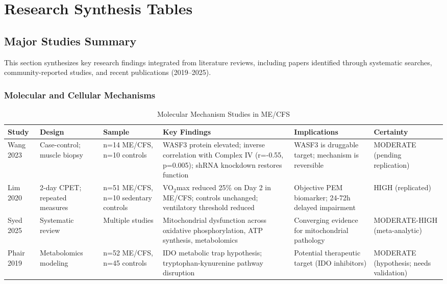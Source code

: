 \chapter{Research Synthesis Tables}
\label{app:research-synthesis}

\section{Major Studies Summary}
\label{sec:major-studies-summary}

This section synthesizes key research findings integrated from literature reviews, including papers identified through systematic searches, community-reported studies, and recent publications (2019--2025).

\subsection{Molecular and Cellular Mechanisms}
\label{subsec:molecular-mechanisms-studies}

\begin{table}[htbp]
\centering
\caption{Molecular Mechanism Studies in ME/CFS}
\label{tab:molecular-studies}
\scriptsize
\begin{tabular}{p{2cm}p{1.8cm}p{2.2cm}p{4cm}p{2.5cm}p{1.8cm}}
\toprule
\textbf{Study} & \textbf{Design} & \textbf{Sample} & \textbf{Key Findings} & \textbf{Implications} & \textbf{Certainty} \\
\midrule
Wang 2023~\cite{wang2023wasf3} & Case-control; muscle biopsy & n=14 ME/CFS, n=10 controls & WASF3 protein elevated; inverse correlation with Complex IV (r=-0.55, p=0.005); shRNA knockdown restores function & WASF3 is druggable target; mechanism is reversible & MODERATE (pending replication) \\
\midrule
Lim 2020~\cite{Lim2020} & 2-day CPET; repeated measures & n=51 ME/CFS, n=10 sedentary controls & VO$_2$max reduced 25\% on Day 2 in ME/CFS; controls unchanged; ventilatory threshold reduced & Objective PEM biomarker; 24-72h delayed impairment & HIGH (replicated) \\
\midrule
Syed 2025~\cite{Syed2025} & Systematic review & Multiple studies & Mitochondrial dysfunction across oxidative phosphorylation, ATP synthesis, metabolomics & Converging evidence for mitochondrial pathology & MODERATE-HIGH (meta-analytic) \\
\midrule
Phair 2019~\cite{phair2019ido} & Metabolomics modeling & n=52 ME/CFS, n=45 controls & IDO metabolic trap hypothesis; tryptophan-kynurenine pathway disruption & Potential therapeutic target (IDO inhibitors) & MODERATE (hypothesis; needs validation) \\
\bottomrule
\end{tabular}
\end{table}

